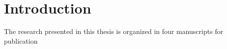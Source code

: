 \chapter{Introduction}
The research presented in this thesis is organized in four manuscripts for publication
